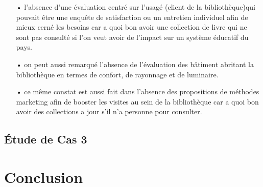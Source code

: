 \documentclass[french,a4paper,12pt]{article}
\begin{document}
\begin{enumerate}
\item[•] l'absence d'une évaluation centré sur l'usagé (client de la bibliothèque)qui pouvait être une enquête de satisfaction ou un entretien individuel afin de mieux cerné les besoins car a quoi bon avoir une collection de livre qui ne sont pas consulté si l'on veut avoir de l'impact sur un système éducatif du pays.
\item[•] on peut aussi remarqué l'absence de l'évaluation des bâtiment abritant la bibliothèque en termes de confort, de rayonnage et de luminaire. 
\item[•] ce même constat est aussi fait dans l'absence des propositions de méthodes marketing afin de booster les visites au sein de la bibliothèque car a quoi bon avoir des collections a jour s'il n'a personne pour consulter.
\end{enumerate} 

\newpage
\subsection{Étude de Cas 3}

\newpage
\section{Conclusion}






\newpage
\begin{center}
\listoffigures
\end{center}

\newpage

\begin{center}


\end{center}
\end{document}

